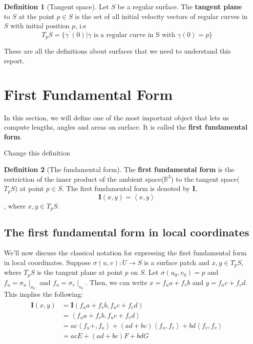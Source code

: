 \documentclass{article}
\theoremstyle{plain}
\theoremstyle{definition}
\newtheorem{definition}{Definition}
\theoremstyle{remark}
\newcommand{\R}{\mathbb{R}}
\begin{document}
\begin{definition}[Tangent space]
    Let \(S\) be a regular surface. The \textbf{tangent plane} to \(S\) at the point \( p \in S\) is the set of all initial velocity vectors of regular curves in \(S\) with initial position \(p\), i.e \[ T_pS = \{ \gamma^\prime(0) | \gamma \text{ is a regular curve in S with }\gamma(0) = p\} \]
\end{definition}

These are all the definitions about surfaces that we need to understand this report.

\section{First Fundamental Form}
In this section, we will define one of the most important object that lets us compute lengths, angles and areas on surface. It is called the \textbf{first fundamental form}.

{\color{red} Change this definition}

\begin{definition}[The fundamental form]
    The \textbf{first fundamental form} is the restriction of the inner product of the ambient space(\(\R^3\)) to the tangent space(\( T_pS\)) at point \( p \in S\). The first fundamental form is denoted by \( \mathbf{I} \), \[ \mathbf{I}(x,y) = \left\langle x,y\right\rangle  \], where \( x,y \in T_pS\).
\end{definition}

\subsection{The first fundamental form in local coordinates}
We'll now discuss the classical notation for expressing the first fundamental form in local coordinates. Suppose \( \sigma(u,v): U \rightarrow S\) is a surface patch and \( x,y \in T_pS \), where \(T_pS\) is the tangent plane at point \(p\) on \(S\). Let \( \sigma(u_0, v_0) = p \) and \( f_u = \sigma_u \mid_{u_0} \) and \( f_u = \sigma_v \mid_{v_0} \). Then, we can write \(x =  f_u a + f_v b\) and \( y =  f_u c + f_v d\). This implies the following:
\begin{align}
    \begin{split}
        \mathbf{I}(x,y) & = \mathbf{I}( f_u a + f_v b,  f_u c + f_v d) \\
        & = \left\langle f_u a + f_v b,  f_u c + f_v d \right\rangle \\
        & = ac\left\langle  f_u  +,  f_u  \right\rangle + (ad+bc)\left\langle  f_u  , f_v  \right\rangle + bd \left\langle f_v , f_v  \right\rangle \\
        & = ac E + (ad+bc)F + bd G
    \end{split}
\end{align}
\end{document}
